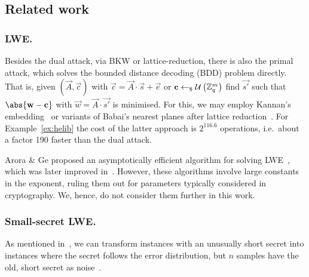 \documentclass[a4paper]{llncs}
\begin{document}
\begin{comment}
attach("estimator/estimator.py")
n, alpha, q = fhe_params(2, 2048)
print cost_str(sis(n, alpha, q, optimisation_target="lp"))
188.9 - log(2.33*10^9,2.0)
\end{comment}

\subsection{Related work}\label{sec:other-algorithms}

\subsubsection{LWE.}

Besides the dual attack, via BKW or lattice-reduction, there is also the primal attack, which solves the bounded distance decoding (BDD) problem directly. That is, given $\left(\vec{A},\vec{c}\right)$ with $\vec{c} = \vec{A} ⋅ \vec{s} + \vec{e}$ or $\vec{c} \sample \U{\ZZq^m}$ find  \(\vec{s'}\) such that \(\abs{\vec{w} - \vec{c}}\)  with  \(\vec{w} = \vec{A} ⋅ \vec{s'}\)  is minimised. For this, we may employ Kannan's embedding~\cite{ICISC:AlbFitGop13} or variants of Babai's nearest planes after lattice reduction~\cite{RSA:LinPei11,RSA:LiuNgu13}. For Example~\ref{ex:helib} the cost of the latter approach is $2^{116.6}$ operations, i.e.~about a factor 190 faster than the dual attack.

Arora \& Ge proposed an asymptotically efficient algorithm for solving LWE~\cite{ICALP:AroGe11}, which was later improved in~\cite{EPRINT:ACFP14}. However, these algorithms involve large constants in the exponent, ruling them out for parameters typically considered in cryptography. We, hence, do not consider them further in this work.

\subsubsection{Small-secret LWE.} As mentioned in~\cite{EPRINT:GenHalSma12}, we can transform instances with an unusually short secret into instances where the secret follows the error distribution, but $n$ samples have the old, short secret as noise~\cite{C:ACPS09}.
\end{document}

